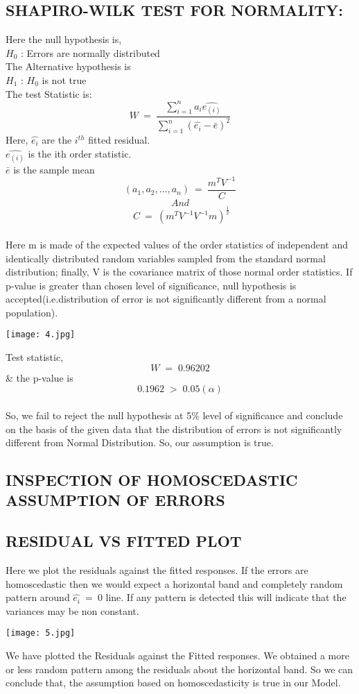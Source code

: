 \documentclass[a4paper,12pt,twoside]{book}
\begin{document}
\subsection{SHAPIRO-WILK TEST FOR NORMALITY:}
Here the null hypothesis is,\\
$H_0$ : Errors are normally distributed\\
The Alternative hypothesis is\\
$H_1$ : $H_0$ is not true\\
The test Statistic is:
\[W\:=\:\frac{\sum_{i=1}^{n}a_i\hat{e_{(i)}}}{\sum_{i=1}^n(\hat{e_i}-\bar{e})^2}\]
Here, $\hat{e_i}$ are the $i^{th}$ fitted residual.\\
$\hat{e_{(i)}}$ is the ith order statistic.\\
$\bar{e}$ is the sample mean\\
\[(a_1,a_2,...,a_n)\:=\:\frac{m^TV^{-1}}{C}\]
\[And\]\[\;C\:=\:(m^TV^{-1}V^{-1}m)^{\frac{1}{2}}\]\\ Here m is made of the expected values of the order statistics of independent and identically
distributed random variables sampled from the standard normal distribution; finally, V is the covariance matrix of those normal order statistics. If p-value is greater than chosen level of significance, null hypothesis is accepted(i.e.distribution of error is not significantly different from a normal population).
\begin{center}
\texttt{[image: 4.jpg]}\\
\end{center}
Test statistic, \[W\;=\;0.96202\] \& the p-value is \[0.1962\;>\;0.05(\alpha)\]\\
So, we fail to reject the null hypothesis at 5\% level of significance and conclude on the basis of the given data that the distribution of errors is not significantly different from Normal Distribution. So, our assumption is true.
\newpage
\subsection*{INSPECTION OF HOMOSCEDASTIC ASSUMPTION OF ERRORS}
\subsection*{RESIDUAL VS FITTED PLOT}
Here we plot the residuals against the fitted responses. If the errors are homoscedastic then we
would expect a horizontal band and completely random pattern around $\hat{e_i}\:=\:0$ line. If any pattern is detected this will indicate that the variances may be non constant.
\begin{center}
\texttt{[image: 5.jpg]}\\
\end{center}
We have plotted the Residuals against the Fitted responses. We obtained a more or less random pattern among the residuals about the horizontal band. So we can conclude that, the assumption based on homoscedasticity is true in our Model.
\end{document}
